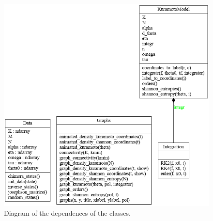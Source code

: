 \documentclass[1pt, a4paper]{article}
\begin{document}
\begin{figure}[htbp]
    \centering
    \includegraphics[scale=0.5]{figures/classes_kuramotoModel.png}
    \caption{Diagram of the dependences of the classes.}
    \label{fig:diagram_classes}
\end{figure}

\newpage


\end{document}
